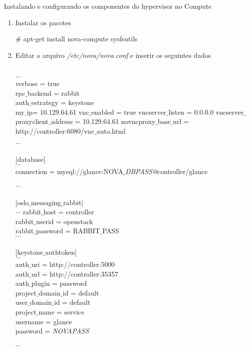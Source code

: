 Instalando e configurando os componentes do hypervisor no Compute
\begin{enumerate}
	\item Instalar os pacotes
	\begin{snugshade}
		\# apt-get install nova-compute sysfsutils
	\end{snugshade}	
	
	\item Editar o arquivo \emph{/etc/nova/nova.conf} e inserir os seguintes dados
	\begin{snugshade}
		[default]\\
		$\cdots$\\
		verbose = true\\
		rpc$\_$backend = rabbit	\\
		auth$\_$estrategy = keystone\\
		my$\_$ip= 	10.129.64.61
		vnc$\_$enabled = true
		vncserver$\_$listen = 0.0.0.0
		vncserver$\_$proxyclient$\_$address = 10.129.64.61
		novncproxy$\_$base$\_$url = http://controller:6080/vnc$\_$auto.html
		
		$\cdots$\\ \\
		
		[database] \\
		$\cdots$ \\
		connection = mysql://glance:NOVA$\_$\emph{DBPASS@}controller/glance \\ \\
		
		$\cdots$\\ \\
		
		[oslo$\_$messaging$\_$rabbit]\\
		$\cdots$
		rabbit$\_$host = controller \\
		rabbit$\_$userid = openstack \\
		rabbit$\_$password = RABBIT$\_$PASS\\
		
		$\cdots$\\ \\		
		
		[keystone$\_$authtoken] \\
		$\cdots$ \\
		auth$\_$uri = http://controller:5000 \\
		auth$\_$url = http://controller:35357 \\
		auth$\_$plugin = password \\
		project$\_$domain$\_$id = default \\
		user$\_$domain$\_$id = default \\
		project$\_$name = service \\				
		username = glance \\
		password = \emph{NOVAPASS}\\ \\
		$\cdots$ \\ \\


\end{snugshade}
\end{enumerate}
